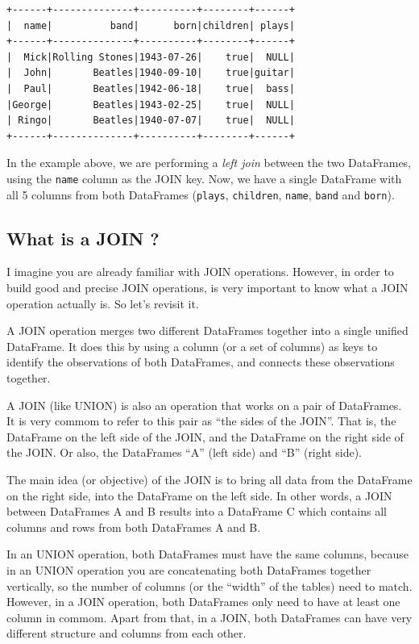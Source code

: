 \documentclass[
  11pt,
  letterpaper,
  DIV=11,
  numbers=noendperiod]{scrreprt}
\begin{document}
\begin{verbatim}
+------+--------------+----------+--------+------+
|  name|          band|      born|children| plays|
+------+--------------+----------+--------+------+
|  Mick|Rolling Stones|1943-07-26|    true|  NULL|
|  John|       Beatles|1940-09-10|    true|guitar|
|  Paul|       Beatles|1942-06-18|    true|  bass|
|George|       Beatles|1943-02-25|    true|  NULL|
| Ringo|       Beatles|1940-07-07|    true|  NULL|
+------+--------------+----------+--------+------+
\end{verbatim}

In the example above, we are performing a \emph{left join} between the
two DataFrames, using the \texttt{name} column as the JOIN key. Now, we
have a single DataFrame with all 5 columns from both DataFrames
(\texttt{plays}, \texttt{children}, \texttt{name}, \texttt{band} and
\texttt{born}).

\hypertarget{what-is-a-join}{%
\subsection{What is a JOIN ?}\label{what-is-a-join}}

I imagine you are already familiar with JOIN operations. However, in
order to build good and precise JOIN operations, is very important to
know what a JOIN operation actually is. So let's revisit it.

A JOIN operation merges two different DataFrames together into a single
unified DataFrame. It does this by using a column (or a set of columns)
as keys to identify the observations of both DataFrames, and connects
these observations together.

A JOIN (like UNION) is also an operation that works on a pair of
DataFrames. It is very commom to refer to this pair as ``the sides of
the JOIN''. That is, the DataFrame on the left side of the JOIN, and the
DataFrame on the right side of the JOIN. Or also, the DataFrames ``A''
(left side) and ``B'' (right side).

The main idea (or objective) of the JOIN is to bring all data from the
DataFrame on the right side, into the DataFrame on the left side. In
other words, a JOIN between DataFrames A and B results into a DataFrame
C which contains all columns and rows from both DataFrames A and B.

In an UNION operation, both DataFrames must have the same columns,
because in an UNION operation you are concatenating both DataFrames
together vertically, so the number of columns (or the ``width'' of the
tables) need to match. However, in a JOIN operation, both DataFrames
only need to have at least one column in commom. Apart from that, in a
JOIN, both DataFrames can have very different structure and columns from
each other.
\end{document}
